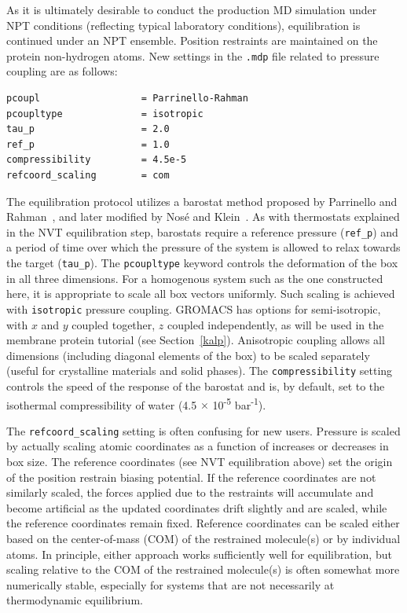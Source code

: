 \documentclass[9pt,tutorial]{livecoms}
\begin{document}
As it is ultimately desirable to conduct the production MD simulation under NPT conditions (reflecting typical laboratory conditions), equilibration is continued under an NPT ensemble. Position restraints are maintained on the protein non-hydrogen atoms. New settings in the \texttt{.mdp} file related to pressure coupling are as follows:

\begin{verbatim}
pcoupl                  = Parrinello-Rahman
pcoupltype              = isotropic
tau_p                   = 2.0
ref_p                   = 1.0
compressibility         = 4.5e-5
refcoord_scaling        = com
\end{verbatim}

The equilibration protocol utilizes a barostat method proposed by Parrinello and Rahman~\cite{Parrinello1981}, and later modified by Nos\'e and Klein~\cite{Nose1983}. As with thermostats explained in the NVT equilibration step, barostats require a reference pressure (\texttt{ref\_p}) and a period of time over which the pressure of the system is allowed to relax towards the target (\texttt{tau\_p}). The \texttt{pcoupltype} keyword controls the deformation of the box in all three dimensions. For a homogenous system such as the one constructed here, it is appropriate to scale all box vectors uniformly. Such scaling is achieved with \texttt{isotropic} pressure coupling. GROMACS has options for semi-isotropic, with $x$ and $y$ coupled together, $z$ coupled independently, as will be used in the membrane protein tutorial (see Section~\ref{kalp}). Anisotropic coupling allows all dimensions (including diagonal elements of the box) to be scaled separately (useful for crystalline materials and solid phases). The \texttt{compressibility} setting controls the speed of the response of the barostat and is, by default, set to the isothermal compressibility of water (4.5 $\times$ 10\textsuperscript{-5} bar\textsuperscript{-1}). 

The \texttt{refcoord\_scaling} setting is often confusing for new users. Pressure is scaled by actually scaling atomic coordinates as a function of increases or decreases in box size. The reference coordinates (see NVT equilibration above) set the origin of the position restrain biasing potential. If the reference coordinates are not similarly scaled, the forces applied due to the restraints will accumulate and become artificial as the updated coordinates drift slightly and are scaled, while the reference coordinates remain fixed. Reference coordinates can be scaled either based on the center-of-mass (COM) of the restrained molecule(s) or by individual atoms. In principle, either approach works sufficiently well for equilibration, but scaling relative to the COM of the restrained molecule(s) is often somewhat more numerically stable, especially for systems that are not necessarily at thermodynamic equilibrium.
\end{document}
